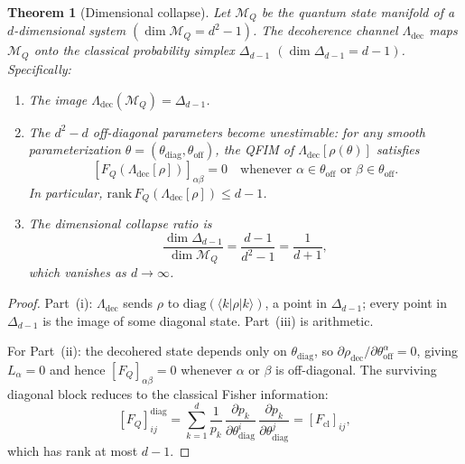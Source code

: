 \documentclass[12pt,a4paper]{article}
\newtheorem{theorem}{Theorem}[section]
\theoremstyle{definition}
\theoremstyle{remark}
\begin{document}
\begin{theorem}[Dimensional collapse]
\label{thm:dim-collapse}
Let $\mathcal{M}_Q$ be the quantum state manifold of a $d$-dimensional system $(\dim \mathcal{M}_Q = d^2 - 1)$. The decoherence channel $\Lambda_{\mathrm{dec}}$ maps $\mathcal{M}_Q$ onto the classical probability simplex $\Delta_{d-1}$ $(\dim \Delta_{d-1} = d-1)$. Specifically:

\begin{enumerate}
\item[\emph{(i)}] The image $\Lambda_{\mathrm{dec}}(\mathcal{M}_Q) = \Delta_{d-1}$.

\item[\emph{(ii)}] The $d^2 - d$ off-diagonal parameters become unestimable: for any smooth parameterization $\theta = (\theta_{\mathrm{diag}}, \theta_{\mathrm{off}})$, the QFIM of $\Lambda_{\mathrm{dec}}[\rho(\theta)]$ satisfies
\begin{equation}
\label{eq:offdiag-vanish}
[F_Q(\Lambda_{\mathrm{dec}}[\rho])]_{\alpha\beta} = 0 \quad \text{whenever } \alpha \in \theta_{\mathrm{off}} \text{ or } \beta \in \theta_{\mathrm{off}}.
\end{equation}
In particular, $\mathrm{rank}\, F_Q(\Lambda_{\mathrm{dec}}[\rho]) \leq d - 1$.

\item[\emph{(iii)}] The dimensional collapse ratio is
\begin{equation}
\label{eq:collapse-ratio}
\frac{\dim \Delta_{d-1}}{\dim \mathcal{M}_Q} = \frac{d-1}{d^2-1} = \frac{1}{d+1},
\end{equation}
which vanishes as $d \to \infty$.
\end{enumerate}
\end{theorem}

\begin{proof}
Part~(i): $\Lambda_{\mathrm{dec}}$ sends $\rho$ to $\mathrm{diag}(\langle k|\rho|k\rangle)$, a point in $\Delta_{d-1}$; every point in $\Delta_{d-1}$ is the image of some diagonal state. Part~(iii) is arithmetic.

For Part~(ii): the decohered state depends only on $\theta_{\mathrm{diag}}$, so $\partial \rho_{\mathrm{dec}}/\partial \theta_{\mathrm{off}}^\alpha = 0$, giving $L_\alpha = 0$ and hence $[F_Q]_{\alpha\beta} = 0$ whenever $\alpha$ or $\beta$ is off-diagonal. The surviving diagonal block reduces to the classical Fisher information:
\begin{equation}
\label{eq:qfim-classical}
[F_Q]_{ij}^{\mathrm{diag}} = \sum_{k=1}^d \frac{1}{p_k}\, \frac{\partial p_k}{\partial \theta_{\mathrm{diag}}^i}\, \frac{\partial p_k}{\partial \theta_{\mathrm{diag}}^j} = [F_{\mathrm{cl}}]_{ij},
\end{equation}
which has rank at most $d - 1$.
\end{proof}
\end{document}
